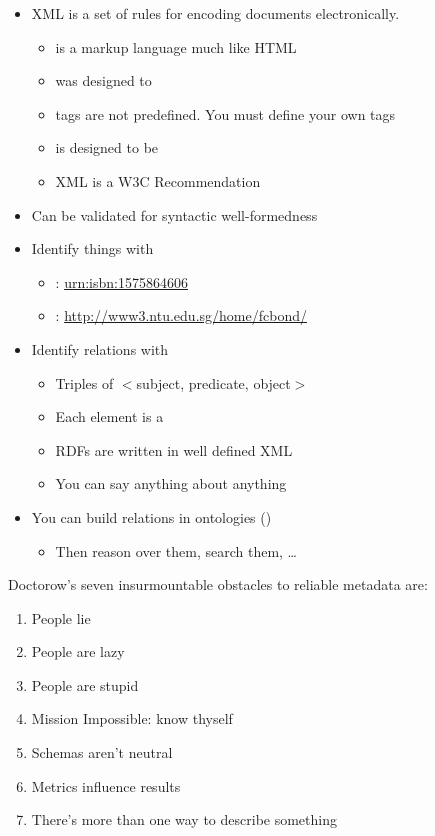 \documentclass[a4paper,landscape,headrule,footrule,xetex]{foils}
\begin{document}

\begin{itemize}
\item XML is a set of rules for encoding documents electronically.
  \begin{itemize}
  \item is a markup language much like HTML
  \item was designed to 
  \item tags are not predefined. You must define your own tags
  \item is designed to be 
  \item XML is a W3C Recommendation
  \end{itemize}
  \item Can be validated for syntactic well-formedness
\end{itemize}


\begin{itemize}
\item Identify things with  
  \begin{itemize}
  \item {}: \url{urn:isbn:1575864606}
  \item {}: \url{http://www3.ntu.edu.sg/home/fcbond/}
  \end{itemize}
\item Identify relations with  
  \begin{itemize}
  \item Triples of $<$subject, predicate, object$>$
  \item Each element is a 
  \item RDFs are written in well defined XML
  \item You can say anything about anything
  \end{itemize}
\item You can build relations in ontologies ()
  \begin{itemize}
  \item Then reason over them, search them, \ldots
  \end{itemize}
\end{itemize}



Doctorow's seven insurmountable obstacles to reliable metadata are:
\begin{enumerate}
\item  People lie
\item  People are lazy
\item  People are stupid
\item  Mission Impossible: know thyself
\item  Schemas aren't neutral
\item  Metrics influence results
\item  There's more than one way to describe something
\end{enumerate}
\end{document}
